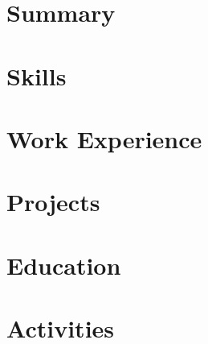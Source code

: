 \documentclass[a4paper,10pt]{article}
\begin{document}
\section{Summary}


\section{Skills}


\section{Work Experience}


\section{Projects}


\section{Education}



\section{Activities}

% 
\end{document}
